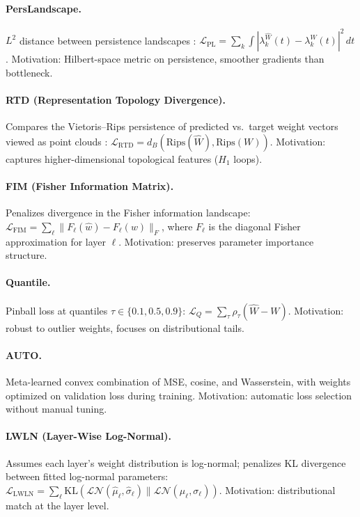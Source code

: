 \documentclass{article}
\begin{document}
\paragraph{PersLandscape.}
$L^2$ distance between persistence landscapes
\citep{bubenikStatisticalTopologicalData2015}:
$\mathcal{L}_{\mathrm{PL}} = \sum_k \int |\lambda_k^{\hat W}(t) -
\lambda_k^W(t)|^2\,dt$.
Motivation: Hilbert-space metric on persistence, smoother gradients
than bottleneck.

\paragraph{RTD (Representation Topology Divergence).}
Compares the Vietoris--Rips persistence of predicted vs.\ target weight
vectors viewed as point clouds
\citep{barannikovRepresentationTopologyDivergence2022}:
$\mathcal{L}_{\mathrm{RTD}} = d_B(\mathrm{Rips}(\hat W),
\mathrm{Rips}(W))$.
Motivation: captures higher-dimensional topological features ($H_1$
loops).

\paragraph{FIM (Fisher Information Matrix).}
Penalizes divergence in the Fisher information landscape:
$\mathcal{L}_{\mathrm{FIM}} = \sum_\ell
\|F_\ell(\hat w) - F_\ell(w)\|_F$, where $F_\ell$ is the diagonal
Fisher approximation for layer $\ell$.
Motivation: preserves parameter importance structure.

\paragraph{Quantile.}
Pinball loss at quantiles $\tau\in\{0.1,0.5,0.9\}$:
$\mathcal{L}_Q = \sum_\tau \rho_\tau(\hat W - W)$.
Motivation: robust to outlier weights, focuses on distributional tails.

\paragraph{AUTO.}
Meta-learned convex combination of MSE, cosine, and Wasserstein,
with weights optimized on validation loss during training.
Motivation: automatic loss selection without manual tuning.

\paragraph{LWLN (Layer-Wise Log-Normal).}
Assumes each layer's weight distribution is log-normal; penalizes
KL divergence between fitted log-normal parameters:
$\mathcal{L}_{\mathrm{LWLN}} = \sum_\ell \mathrm{KL}(
\mathcal{LN}(\hat\mu_\ell,\hat\sigma_\ell) \|
\mathcal{LN}(\mu_\ell,\sigma_\ell))$.
Motivation: distributional match at the layer level.
\end{document}
